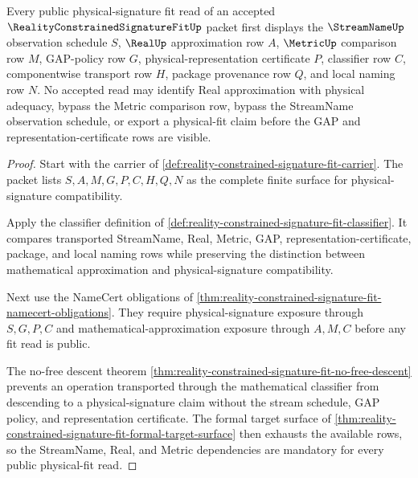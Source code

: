\begin{theorem}
\label{thm:reality-constrained-signature-fit-metric-streamname-real-dependency}
Every public physical-signature fit read of an accepted $\RealityConstrainedSignatureFitUp$ packet first displays the $\StreamNameUp$ observation schedule $S$, $\RealUp$ approximation row $A$, $\MetricUp$ comparison row $M$, GAP-policy row $G$, physical-representation certificate $P$, classifier row $C$, componentwise transport row $H$, package provenance row $Q$, and local naming row $N$. No accepted read may identify Real approximation with physical adequacy, bypass the Metric comparison row, bypass the StreamName observation schedule, or export a physical-fit claim before the GAP and representation-certificate rows are visible.
\end{theorem}
\begin{proof}
Start with the carrier of \autoref{def:reality-constrained-signature-fit-carrier}. The packet lists $S,A,M,G,P,C,H,Q,N$ as the complete finite surface for physical-signature compatibility.

Apply the classifier definition of \autoref{def:reality-constrained-signature-fit-classifier}. It compares transported StreamName, Real, Metric, GAP, representation-certificate, package, and local naming rows while preserving the distinction between mathematical approximation and physical-signature compatibility.

Next use the NameCert obligations of \autoref{thm:reality-constrained-signature-fit-namecert-obligations}. They require physical-signature exposure through $S,G,P,C$ and mathematical-approximation exposure through $A,M,C$ before any fit read is public.

The no-free descent theorem \autoref{thm:reality-constrained-signature-fit-no-free-descent} prevents an operation transported through the mathematical classifier from descending to a physical-signature claim without the stream schedule, GAP policy, and representation certificate. The formal target surface of \autoref{thm:reality-constrained-signature-fit-formal-target-surface} then exhausts the available rows, so the StreamName, Real, and Metric dependencies are mandatory for every public physical-fit read.
\end{proof}

